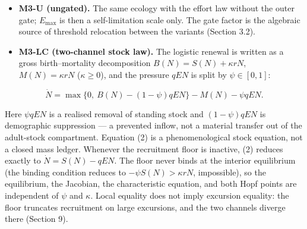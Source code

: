 \documentclass[11pt]{article}
\begin{document}
\begin{itemize}
\item
  \textbf{M3-U (ungated).} The same ecology with the effort law without
  the outer gate; \(E_{\max}\) is then a self-limitation scale only. The
  gate factor is the algebraic source of threshold relocation between
  the variants (Section 3.2).
\item
  \textbf{M3-LC (two-channel stock law).} The logistic renewal is
  written as a gross birth--mortality decomposition
  \(B(N) = S(N) + \kappa rN\), \(M(N) = \kappa rN\) (\(\kappa \ge 0\)),
  and the pressure \(qEN\) is split by \(\psi \in [0,1]\):
\end{itemize}

\[\dot N = \max\{0,\ B(N) - (1-\psi)qEN\} - M(N) - \psi qEN. \tag{2}\]

Here \(\psi qEN\) is a realised removal of standing stock and
\((1-\psi)qEN\) is demographic suppression --- a prevented inflow, not a
material transfer out of the adult-stock compartment. Equation (2) is a
phenomenological stock equation, not a closed mass ledger. Whenever the
recruitment floor is inactive, (2) reduces exactly to
\(\dot N = S(N) - qEN\). The floor never binds at the interior
equilibrium (the binding condition reduces to
\(-\psi S(N) > \kappa rN\), impossible), so the equilibrium, the
Jacobian, the characteristic equation, and both Hopf points are
independent of \(\psi\) and \(\kappa\). Local equality does not imply
excursion equality: the floor truncates recruitment on large excursions,
and the two channels diverge there (Section 9).
\end{document}

